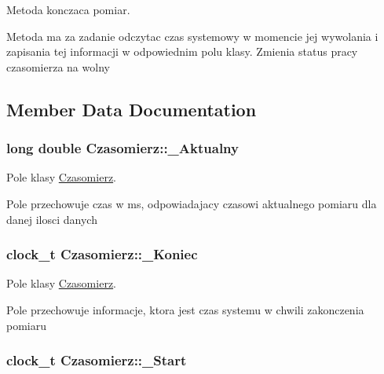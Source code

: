 Metoda konczaca pomiar. 

Metoda ma za zadanie odczytac czas systemowy w momencie jej wywolania i zapisania tej informacji w odpowiednim polu klasy. Zmienia status pracy czasomierza na wolny 

\subsection{Member Data Documentation}
\hypertarget{class_czasomierz_ae09344cf8ca5613cd557cb4fcf9aa046}{
\subsubsection[{\-\_\-\-Aktualny}]{\setlength{\rightskip}{0pt plus 5cm}long double Czasomierz\-::\-\_\-\-Aktualny\hspace{0.3cm}{\ttfamily [private]}}}\label{class_czasomierz_ae09344cf8ca5613cd557cb4fcf9aa046}


Pole klasy \hyperlink{class_czasomierz}{Czasomierz}. 

Pole przechowuje czas w ms, odpowiadajacy czasowi aktualnego pomiaru dla danej ilosci danych \hypertarget{class_czasomierz_a1d791b2017e7f992a2206155982055af}{
\subsubsection[{\-\_\-\-Koniec}]{\setlength{\rightskip}{0pt plus 5cm}clock\-\_\-t Czasomierz\-::\-\_\-\-Koniec\hspace{0.3cm}{\ttfamily [private]}}}\label{class_czasomierz_a1d791b2017e7f992a2206155982055af}


Pole klasy \hyperlink{class_czasomierz}{Czasomierz}. 

Pole przechowuje informacje, ktora jest czas systemu w chwili zakonczenia pomiaru \hypertarget{class_czasomierz_aba798db3d70227410bfafbb01a52d755}{
\subsubsection[{\-\_\-\-Start}]{\setlength{\rightskip}{0pt plus 5cm}clock\-\_\-t Czasomierz\-::\-\_\-\-Start\hspace{0.3cm}{\ttfamily [private]}}}\label{class_czasomierz_aba798db3d70227410bfafbb01a52d755}


